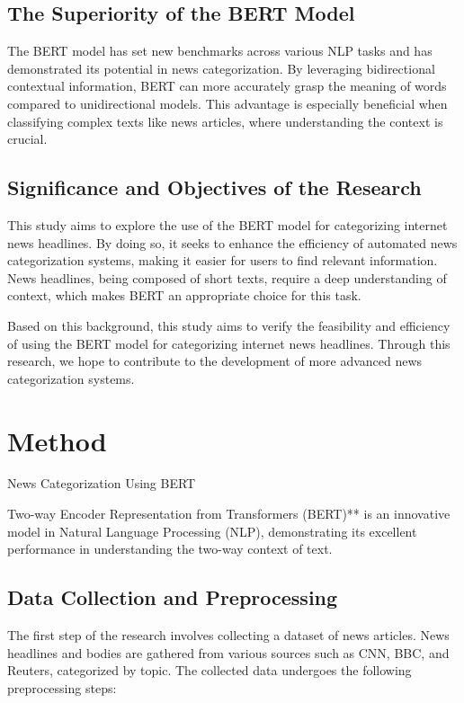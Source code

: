 \documentclass{article}
\begin{document}
\subsection{The Superiority of the BERT Model}
The BERT model has set new benchmarks across various NLP tasks and has demonstrated its potential in news categorization. By leveraging bidirectional contextual information, BERT can more accurately grasp the meaning of words compared to unidirectional models. This advantage is especially beneficial when classifying complex texts like news articles, where understanding the context is crucial.

\subsection{Significance and Objectives of the Research}
This study aims to explore the use of the BERT model for categorizing internet news headlines. By doing so, it seeks to enhance the efficiency of automated news categorization systems, making it easier for users to find relevant information. News headlines, being composed of short texts, require a deep understanding of context, which makes BERT an appropriate choice for this task.

Based on this background, this study aims to verify the feasibility and efficiency of using the BERT model for categorizing internet news headlines. Through this research, we hope to contribute to the development of more advanced news categorization systems.

\section{Method}

\label{headings}
News Categorization Using BERT

Two-way Encoder Representation from Transformers (BERT)** is an innovative model in Natural Language Processing (NLP), demonstrating its excellent performance in understanding the two-way context of text.

\subsection{Data Collection and Preprocessing}

The first step of the research involves collecting a dataset of news articles. News headlines and bodies are gathered from various sources such as CNN, BBC, and Reuters, categorized by topic. The collected data undergoes the following preprocessing steps:
\end{document}
